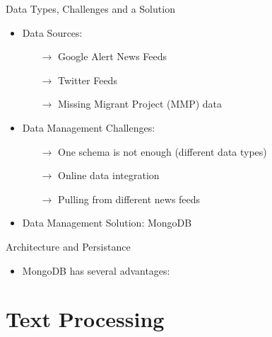 \documentclass{beamer}
\begin{document}
\begin{frame}{Data Types, Challenges and a Solution}
\begin{itemize}
\item Data Sources:

	\begin{itemize}
		\item[$\rightarrow$] Google Alert News Feeds
		\item[$\rightarrow$] Twitter Feeds
		\item[$\rightarrow$] Missing Migrant Project (MMP) data
	\end{itemize}

\item Data Management Challenges:

	\begin{itemize}
		\item[$\rightarrow$] One schema is not enough (different data types)
		\item[$\rightarrow$] Online data integration
		\item[$\rightarrow$] Pulling from different news feeds
	\end{itemize}
	
\item Data Management Solution: MongoDB	

\end{itemize}
\end{frame}



\begin{frame}{Architecture and Persistance}
\begin{itemize}
\item MongoDB has several advantages:
\end{itemize}
\end{frame}

\section{Text Processing}

\end{document}
